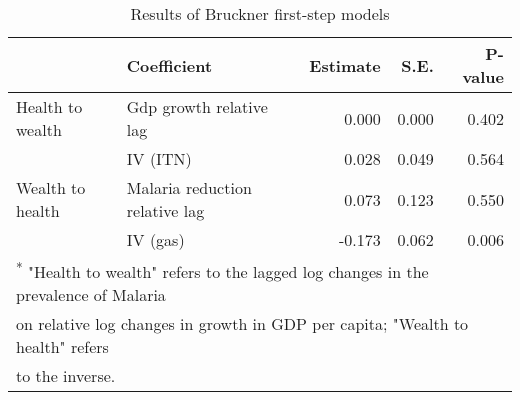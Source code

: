 \begin{table}

\caption{\label{tab:}Results of Bruckner first-step models}
\centering
\begin{tabular}[t]{llrrr}
\toprule
 & Coefficient & Estimate & S.E. & P-value\\
\midrule
Health to wealth & Gdp growth relative lag & 0.000 & 0.000 & 0.402\\
 & IV (ITN) & 0.028 & 0.049 & 0.564\\
Wealth to health & Malaria reduction relative lag & 0.073 & 0.123 & 0.550\\
 & IV (gas) & -0.173 & 0.062 & 0.006\\
\bottomrule
\multicolumn{5}{l}{\textsuperscript{*} "Health to wealth" refers to the lagged log changes in the prevalence of Malaria}\\
\multicolumn{5}{l}{on relative log changes in growth in GDP per capita; "Wealth to health" refers}\\
\multicolumn{5}{l}{to the inverse.}\\
\end{tabular}
\end{table}
